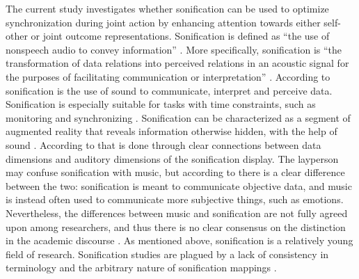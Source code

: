 \documentclass[10pt,a4paper,onecolumn]{article}
\begin{document}
The current study investigates whether sonification can be used to optimize synchronization during joint action by enhancing attention towards either self-other or joint outcome representations. Sonification is defined as ``the use of nonspeech audio to convey information'' \autocite[p.~4]{kramerSonificationReportStatus1999}. More specifically, sonification is ``the transformation of data relations into perceived relations in an acoustic signal for the purposes of facilitating communication or interpretation'' \autocite[p.~4]{kramerSonificationReportStatus1999}. According to \autocite{dubusInteractiveSonificationMotion2013} sonification is the use of sound to communicate, interpret and perceive data. Sonification is especially suitable for tasks with time constraints, such as monitoring and synchronizing \autocite{dubusInteractiveSonificationMotion2013}. Sonification can be characterized as a segment of augmented reality that reveals information otherwise hidden, with the help of sound \autocite{dubusInteractiveSonificationMotion2013}. According to \autocite{dubusInteractiveSonificationMotion2013} that is done through clear connections between data dimensions and auditory dimensions of the sonification display. The layperson may confuse sonification with music, but according to \autocite{dubusInteractiveSonificationMotion2013} there is a clear difference between the two: sonification is meant to communicate objective data, and music is instead often used to communicate more subjective things, such as emotions. Nevertheless, the differences between music and sonification are not fully agreed upon among researchers, and thus there is no clear consensus on the distinction in the academic discourse \autocite{dubusInteractiveSonificationMotion2013}. As mentioned above, sonification is a relatively young field of research. Sonification studies are plagued by a lack of consistency in terminology and the arbitrary nature of sonification mappings \autocite{dubusInteractiveSonificationMotion2013,dubusSystematicReviewMapping2013}.
\end{document}
